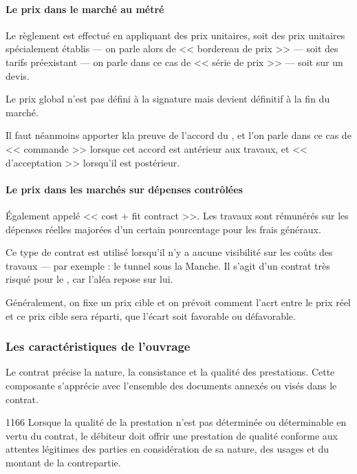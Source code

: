 				\paragraph{Le prix dans le marché au métré\\}
				
				Le règlement est effectué en appliquant des prix unitaires, soit des prix unitaires spécialement établis --- on parle alors de << bordereau de prix >> --- soit des tarifs préexistant --- on parle dans ce cas de << série de prix >> --- soit sur un devis.
				
				Le prix global n'est pas défini à la signature mais devient définitif à la fin du marché.
				
				Il faut néanmoins apporter kla preuve de l'accord du \Mo, et l'on parle dans ce cas de << commande >> lorsque cet accord est antérieur aux travaux, et << d'acceptation >> lorsqu'il est postérieur.
				
				\paragraph{Le prix dans les marchés sur dépenses contrôlées\\}
				
				Également appelé << cost + fit contract >>. Les travaux sont rémunérés sur les dépenses réelles majorées d'un certain pourcentage pour les frais généraux.
				
				Ce type de contrat est utilisé lorsqu'il n'y a aucune visibilité sur les coûts des travaux --- par exemple : le tunnel sous la Manche. Il s'agit d'un contrat très risqué pour le \Mo, car l'aléa repose sur lui.
				
				Généralement, on fixe un prix cible et on prévoit comment l'acrt entre le prix réel et ce prix cible sera réparti, que l'écart soit favorable ou défavorable.
			
			\subsubsection{Les caractéristiques de l'ouvrage}
			
				Le contrat précise la nature, la consistance et la qualité des prestations. Cette composante s'apprécie avec l'ensemble des documents annexés ou visés dans le contrat.
				
				\begin{citationArticleCciv}{1166}
					Lorsque la qualité de la prestation n'est pas déterminée ou déterminable en vertu du contrat, le débiteur doit offrir une prestation de qualité conforme aux attentes légitimes des parties en considération de sa nature, des usages et du montant de la contrepartie.
				\end{citationArticleCciv}
			

